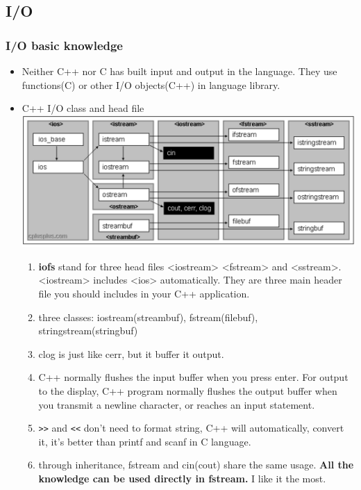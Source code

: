 \documentclass[a4paper,12pt,twoside]{book}
\begin{document}
\subsection{I/O}
\subsubsection{I/O basic knowledge}
\begin{itemize}
\item Neither C++ nor C has built input and output in the language. They use functions(C) or other I/O objects(C++) in language library.
\item C++ I/O class and head file \\
\includegraphics[scale=0.45]{pics/io.png}
\begin{enumerate}


\item \textbf{iofs} stand for three head files <iostream> <fstream> and <sstream>. <iostream> includes <ios> automatically. They are three main header file you should includes in your C++ application.

\item three classes: iostream(streambuf), fstream(filebuf), stringstream(stringbuf)

\item clog is just like cerr, but it buffer it output.

\item C++ normally flushes the input buffer when you press enter. For output to the display, C++ program normally flushes the output buffer when you transmit a newline character, or reaches an input statement.

\item \verb=>>= and \verb=<<= don't need to format string,  C++ will automatically,  convert it, it's better than printf and scanf in C language.

\item through inheritance, fstream and cin(cout) share the same usage. \textbf{All the knowledge can be used directly in fstream.} I like it the most.

\end{enumerate}

\end{itemize}
\end{document}
